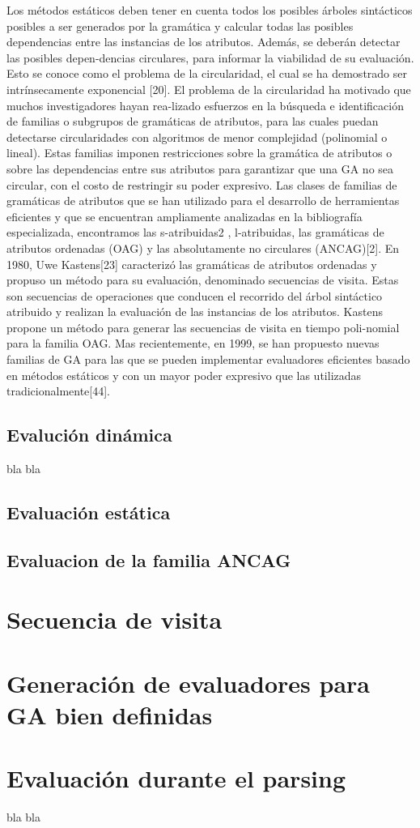 Los métodos estáticos deben tener en cuenta todos los posibles árboles sintácticos posibles a ser generados por la gramática y calcular todas las posibles dependencias entre las instancias de los atributos. Además, se deberán detectar las posibles depen-dencias circulares, para informar la viabilidad de su evaluación.
Esto se conoce como el problema de la circularidad, el cual se ha demostrado ser intrínsecamente exponencial [20]. El problema de la circularidad ha motivado que muchos investigadores hayan rea-lizado esfuerzos en la búsqueda e identificación de familias o subgrupos de gramáticas de atributos, para las cuales puedan detectarse circularidades con algoritmos de menor complejidad (polinomial o lineal).
Estas familias imponen restricciones sobre la gramática de atributos o sobre las dependencias entre sus atributos para garantizar que una GA no sea circular, con el costo de restringir su poder expresivo. 
Las clases de familias de gramáticas de atributos que se han utilizado para el desarrollo de herramientas eficientes y que se encuentran ampliamente analizadas en la bibliografía especializada, encontramos las s-atribuidas2 , l-atribuidas, las gramáticas de atributos ordenadas (OAG) y las absolutamente no circulares (ANCAG)[2]. En 1980, Uwe Kastens[23] caracterizó las gramáticas de atributos ordenadas y propuso un método para su evaluación, denominado secuencias de visita. Estas son secuencias de operaciones que conducen el recorrido del árbol sintáctico atribuido y realizan la evaluación de las instancias de los atributos. Kastens propone un método para generar las secuencias de visita en tiempo poli-nomial para la familia OAG.
Mas recientemente, en 1999, se han propuesto nuevas familias de GA para las que se pueden implementar evaluadores eficientes basado en métodos estáticos y con un mayor poder expresivo que las utilizadas tradicionalmente[44].



\subsection{Evaluci\'on din\'amica}

bla bla

\subsection{Evaluaci\'on est\'atica}

\subsection{Evaluacion de la familia ANCAG}
\section{Secuencia de visita}
\section{Generaci\'on de evaluadores para GA bien definidas}
\section{Evaluaci\'on durante el parsing}

bla bla

